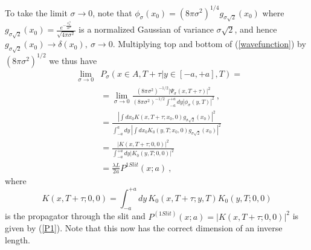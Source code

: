 \documentclass[12pt,aps,prb,preprint]{revtex4-1}   %
\begin{document}
To take the limit $\sigma \to 0$, note that $\phi_\sigma(x_0) =
(8\pi\sigma^2)^{1/4}g_{\sigma\sqrt{2}}(x_0)$ where
$g_{\sigma\sqrt{2}}(x_0)=\frac{e^{-\frac{x_0^{'2}}{4\sigma^2}}}{\sqrt{4\pi\sigma^2}}$
is a normalized Gaussian of variance $\sigma\sqrt{2}$, and hence
$g_{\sigma\sqrt{2}}(x_0) \rightarrow \delta(x_0),\
\sigma\rightarrow0$. Multiplying top and bottom of
(\ref{wavefunction}) by $(8\pi \sigma^2)^{1/2}$ we thus have
\begin{eqnarray}
&\lim_{\sigma\rightarrow0}&P_\sigma\left(x\in A,T+\tau|y\in
[-a,+a],T\right)= {}\nonumber\\{}&&=\lim_{\sigma\rightarrow 0}
\frac{(8\pi\sigma^2)^{-1/2}
|\Psi_\sigma(x,T+\tau)|^2}{(8\pi\sigma^2)^{-1/2}\int_{-a}^{+a}dy
|\phi_\sigma(y,T)|^2}\ , {}\nonumber\\{}&&= \frac{\left| \int dx_0
K(x,T+\tau; x_0,0) g_{\sigma \sqrt{2}}(x_0) \right|^2}{\int_{-a}^a
dy\, \left| \int dx_0 K_0(y,T;x_0,0) g_{\sigma \sqrt{2}} (x_0)
\right|^2} {}\nonumber\\{}&&= \frac{
|K(x,T+\tau;0,0)|^2}{\int_{-a}^{+a} dy |K_0(y,T;0,0)|^2}
{}\nonumber\\{}&&=\frac{\lambda L}{2a}  P^{1 Slit}(x;a)\ ,
\end{eqnarray}
where \begin{equation} \label{propagator} K(x,T+\tau;0,0) =
\int_{-a}^{+a} dy\, K_0(x,T+\tau;y,T) K_0(y,T;0,0) \end{equation}
is the propagator through the slit and $P^{(1 Slit)}(x;a) =
|K(x,T+\tau;0,0)|^2$ is given by (\ref{P1}). Note that this now
has the correct dimension of an inverse length.
\end{document}
